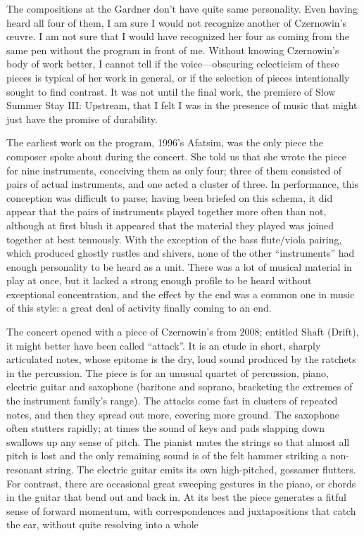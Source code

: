 The compositions at the Gardner don’t have quite same personality. Even having heard all four of them, I am sure I would not recognize another of Czernowin’s œuvre. I am not sure that I would have recognized her four as coming from the same pen without the program in front of me. Without knowing Czernowin’s body of work better, I cannot tell if the voice—obscuring eclecticism of these pieces is typical of her work in general, or if the selection of pieces intentionally sought to find contrast. It was not until the final work, the premiere of Slow Summer Stay III: Upstream, that I felt I was in the presence of music that might just have the promise of durability.

The earliest work on the program, 1996’s Afatsim, was the only piece the composer spoke about during the concert. She told us that she wrote the piece for nine instruments, conceiving them as only four; three of them consisted of pairs of actual instruments, and one acted a cluster of three. In performance, this conception was difficult to parse; having been briefed on this schema, it did appear that the pairs of instruments played together more often than not, although at first blush it appeared that the material they played was joined together at best tenuously. With the exception of the bass flute/viola pairing, which produced ghostly rustles and shivers, none of the other “instruments” had enough personality to be heard as a unit. There was a lot of musical material in play at once, but it lacked a strong enough profile to be heard without exceptional concentration, and the effect by the end was a common one in music of this style: a great deal of activity finally coming to an end.

The concert opened with a piece of Czernowin’s from 2008; entitled Shaft (Drift), it might better have been called “attack”. It is an etude in short, sharply articulated notes, whose epitome is the dry, loud sound produced by the ratchets in the percussion. The piece is for an unusual quartet of percussion, piano, electric guitar and saxophone (baritone and soprano, bracketing the extremes of the instrument family’s range). The attacks come fast in clusters of repeated notes, and then they spread out more, covering more ground. The saxophone often stutters rapidly; at times the sound of keys and pads slapping down swallows up any sense of pitch. The pianist mutes the strings so that almost all pitch is lost and the only remaining sound is of the felt hammer striking a non-resonant string. The electric guitar emits its own high-pitched, gossamer flutters. For contrast, there are occasional great sweeping gestures in the piano, or chords in the guitar that bend out and back in. At its best the piece generates a fitful sense of forward momentum, with correspondences and juxtapositions that catch the ear, without quite resolving into a whole

